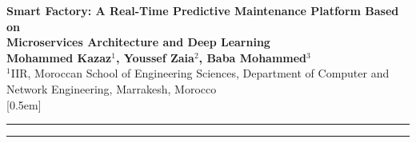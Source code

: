 \documentclass{ijceds} %
\begin{document}
\setcounter{page}{1}

\begin{center}
\Large\textbf{Smart Factory: A Real-Time Predictive Maintenance Platform Based on\\Microservices Architecture and Deep Learning}\\[1em]
\large \textbf{Mohammed Kazaz$^{1}$, Youssef Zaia$^{2}$, Baba Mohammed$^{3}$}\\[0.5em]
\small
$^{1}$IIR, Moroccan School of Engineering Sciences, Department of Computer and Network Engineering, Marrakesh, Morocco\\
[0.5em]
\end{center}

\vspace{0.5em}
\hrule
\vspace{0.2em}
\hrule
\vspace{1em}
\end{document}
